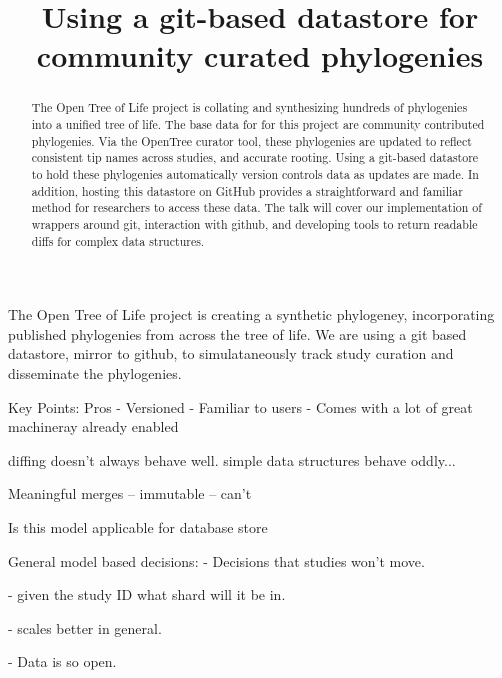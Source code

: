 \documentclass[a4paper,10pt]{article}
\title{Using a git-based datastore for community curated phylogenies}
\author{}
\begin{document}
\maketitle

\begin{abstract}
The Open Tree of Life project is collating and synthesizing hundreds of phylogenies into a unified tree of life. 
The base data for for this project are community contributed phylogenies. 
Via the OpenTree curator tool, these phylogenies are updated to reflect consistent tip names across studies, and accurate rooting. 
Using a git-based datastore to hold these phylogenies automatically version controls data as updates are made. 
In addition, hosting this datastore on GitHub provides a straightforward and familiar method for researchers to access these data. 
The talk will cover our implementation of wrappers around git, interaction with github, and developing tools to return readable diffs for complex data structures.
\end{abstract}

\section{}
The Open Tree of Life project is creating a synthetic phylogeney, incorporating published phylogenies from across the tree of life.
We are using a git based datastore, mirror to github, to simulataneously track study curation and disseminate the phylogenies.


Key Points:
Pros
 - Versioned
 - Familiar to users
 - Comes with a lot of great machineray already enabled

diffing doesn't always behave well.
simple data structures behave oddly...

Meaningful merges
 -- immutable
 -- can't

Is this model applicable for database store

General model based decisions:
- Decisions that studies won't move.

- given the study ID what shard will it be in.

- scales better in general.

- Data is so open.
\end{document}
